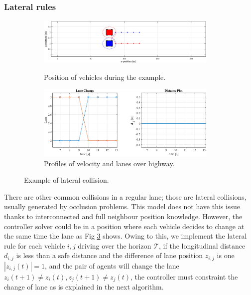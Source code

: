 \subsubsection{Lateral rules}

\begin{figure}
\begin{subfigure}[H]{1\textwidth}
\centering
    \includegraphics[width=0.95\textwidth]{Kap3/untitled.eps}
    \label{fig:lat_col1}
    \caption{Position of vehicles during the example.}
\end{subfigure}%
\vspace{1cm}
\begin{subfigure}[b]{1\textwidth}
\centering
    \includegraphics[width=0.95\textwidth]{Kap3/plot_change_line.eps}
    \caption{ Profiles of velocity and lanes over highway.}
    \label{fig:lat_col2}
\end{subfigure}
\caption{  Example of lateral collision.  }
\label{fig:lat_col}
\end{figure}

There are other common collisions in a regular lane; those are lateral collisions, usually generated by occlusion problems. This model does not have this issue thanks to interconnected and full neighbour position knowledge. However, the controller solver could be in a position where each vehicle decides to change at the same time the lane as Fig \ref{fig:lat_col} shows. Owing to this, we implement the lateral rule for each vehicle $i,j$ driving over the horizon $\mathcal{T}$, if the longitudinal distance $d_{i,j}$ is less than a safe distance and the difference of lane position $z_{i,j}$ is one $\left| z_{i,j} (t) \right|=1$, and the pair of agents will change the lane $z_{i} (t+1) \neq z_{i} (t), z_{j} (t+1) \neq z_{j} (t)$, the controller must constraint the change of lane as is explained in the next algorithm.

